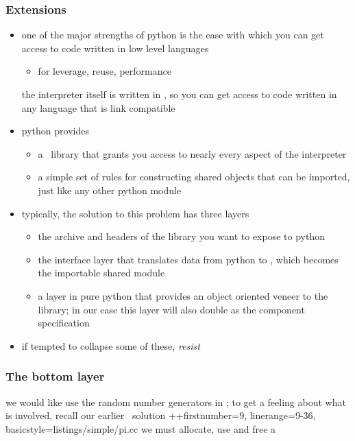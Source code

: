 %
%


\begin{frame}[fragile]
%
  \frametitle{Extensions}
%
  \begin{itemize}
  \item one of the major strengths of python is the ease with which you can get access to code
    written in low level languages
    \begin{itemize}
    \item for leverage, reuse, performance
    \end{itemize}
    the interpreter itself is written in \cc, so you can get access to code written in any
    language that is link compatible
%
  \item python provides
    \begin{itemize}
    \item a \cc\ library that grants you access to nearly every aspect of the interpreter
    \item a simple set of rules for constructing shared objects that can be imported, just like
      any other python module
    \end{itemize}
%
  \item typically, the solution to this problem has three layers
    \begin{itemize}
    \item the archive and headers of the library you want to expose to python
    \item the interface layer that translates data from python to \cc, which becomes the
      importable shared module
    \item a layer in pure python that provides an object oriented veneer to the library; in
      our case this layer will also double as the component specification
    \end{itemize}
%
  \item if tempted to collapse some of these, \emph{resist}
%
  \end{itemize}
%
\end{frame}

\begin{frame}[fragile]
%
  \frametitle{The bottom layer}
%
  we would like use the random number generators in \GSL; to get a feeling about what is
  involved, recall our earlier \cpp\ solution
%
  \C++{firstnumber=9, linerange={9-36}, basicstyle=\tt\tiny}{listings/simple/pi.cc}
%
 we must allocate, use and free a 
%
\end{frame}

